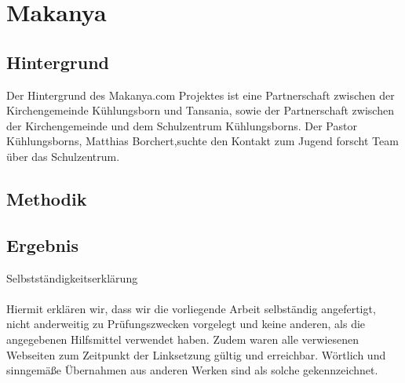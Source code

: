 \documentclass[a4paper,oneside,12pt,titlepage]{article}
\newcommand{\jf}{Jugend forscht }
\begin{document}
\section{Makanya}

\subsection{Hintergrund} %
Der Hintergrund des Makanya.com Projektes ist eine Partnerschaft zwischen der Kirchengemeinde Kühlungsborn und Tansania, sowie der Partnerschaft zwischen der Kirchengemeinde und dem Schulzentrum Kühlungsborns. Der Pastor Kühlungsborns, Matthias Borchert,suchte den Kontakt zum \jf Team über das Schulzentrum.

\subsection{Methodik} %
\subsection{Ergebnis} %


\newpage
\renewcommand{\refname}{Literatur} 			%
\printbibliography
\small


\newpage
\Large{Selbstständigkeitserklärung}\\
\\
\small Hiermit erklären wir, dass wir die vorliegende Arbeit selbständig angefertigt, nicht anderweitig zu Prüfungszwecken vorgelegt und keine anderen, als die angegebenen Hilfsmittel verwendet haben. Zudem waren alle verwiesenen Webseiten zum Zeitpunkt der Linksetzung gültig und erreichbar. Wörtlich und sinngemäße Übernahmen aus anderen Werken sind als solche gekennzeichnet.
\\
\end{document}
